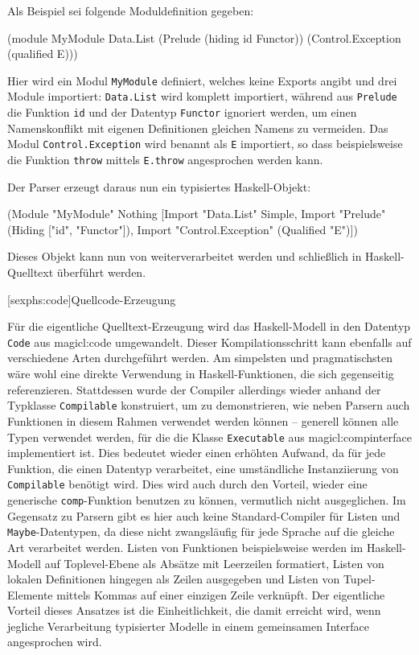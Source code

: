 \documentclass[12pt, a4paper, bibgerm]{scrbook}
\newenvironment{DIFnomarkup}{}{}
\newcommand\icode[1]{\lstinline?#1?}
\newcommand\lsection{}
\newcommand\sref{}
\begin{document}
Als Beispiel sei folgende Moduldefinition gegeben:
\begin{DIFnomarkup}\begin{code}
(module MyModule
  Data.List
  (Prelude (hiding id Functor))
  (Control.Exception (qualified E)))
\end{code}\end{DIFnomarkup}
Hier wird ein Modul \icode{MyModule} definiert, welches keine Exports
angibt und drei Module importiert: \icode{Data.List} wird komplett
importiert, während aus \icode{Prelude} die Funktion \icode{id} und der
Datentyp \icode{Functor} ignoriert werden, um einen Namenskonflikt mit
eigenen Definitionen gleichen Namens zu vermeiden. Das Modul
\icode{Control.Exception} wird benannt als \icode{E} importiert, so dass
beispielsweise die Funktion \icode{throw} mittels \icode{E.throw}
angesprochen werden kann.

Der Parser erzeugt daraus nun ein typisiertes Haskell-Objekt:
\begin{DIFnomarkup}\begin{code}
(Module "MyModule"
         Nothing
         [Import "Data.List" Simple,
          Import "Prelude" (Hiding ["id", "Functor"]),
          Import "Control.Exception" (Qualified "E")])
\end{code}\end{DIFnomarkup}
Dieses Objekt kann nun von weiterverarbeitet werden und schließlich in
Haskell-Quelltext überführt werden.

\lsection[sexphs:code]{Quellcode-Erzeugung}

Für die eigentliche Quelltext-Erzeugung wird das Haskell-Modell in den
Datentyp \icode{Code} aus \sref{magicl:code} umgewandelt. Dieser
Kompilationsschritt kann ebenfalls auf verschiedene Arten durchgeführt
werden. Am simpelsten und pragmatischsten wäre wohl eine direkte
Verwendung in Haskell-Funktionen, die sich gegenseitig
referenzieren. Stattdessen wurde der Compiler allerdings wieder
anhand der Typklasse \icode{Compilable} konstruiert, um zu
demonstrieren, wie neben Parsern auch Funktionen in diesem Rahmen
verwendet werden können -- generell können alle Typen verwendet werden,
für die die Klasse \icode{Executable} aus \sref{magicl:compinterface}
implementiert ist. Dies bedeutet wieder einen erhöhten Aufwand, da für
jede Funktion, die einen Datentyp verarbeitet, eine umständliche
Instanziierung von \icode{Compilable} benötigt wird. Dies wird auch
durch den Vorteil, wieder eine generische \icode{comp}-Funktion
benutzen zu können, vermutlich nicht ausgeglichen. Im Gegensatz zu
Parsern gibt es hier auch keine Standard-Compiler für Listen und
\icode{Maybe}-Datentypen, da diese nicht zwangsläufig für jede Sprache
auf die gleiche Art verarbeitet werden. Listen von Funktionen
beispielsweise werden im Haskell-Modell auf Toplevel-Ebene als Absätze
mit Leerzeilen formatiert, Listen von lokalen Definitionen hingegen
als Zeilen ausgegeben und Listen von Tupel-Elemente mittels Kommas
auf einer einzigen Zeile verknüpft. Der eigentliche Vorteil dieses
Ansatzes ist die Einheitlichkeit, die damit erreicht wird, wenn
jegliche Verarbeitung typisierter Modelle in einem gemeinsamen
Interface angesprochen wird.
\end{document}
